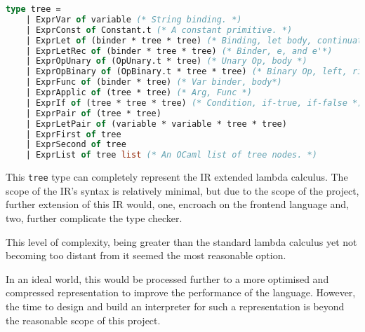 \documentclass{l4proj}
\begin{document}
\begin{lstlisting}[language=Caml, breaklines=false, label=ir-ast, caption=The Abstract Syntax for PyFunc's IR written in OCaml.]
type tree = 
    | ExprVar of variable (* String binding. *)
    | ExprConst of Constant.t (* A constant primitive. *)
    | ExprLet of (binder * tree * tree) (* Binding, let body, continuation. *)
    | ExprLetRec of (binder * tree * tree) (* Binder, e, and e'*)
    | ExprOpUnary of (OpUnary.t * tree) (* Unary Op, body *)
    | ExprOpBinary of (OpBinary.t * tree * tree) (* Binary Op, left, right *)
    | ExprFunc of (binder * tree) (* Var binder, body*)
    | ExprApplic of (tree * tree) (* Arg, Func *)
    | ExprIf of (tree * tree * tree) (* Condition, if-true, if-false *)
    | ExprPair of (tree * tree)
    | ExprLetPair of (variable * variable * tree * tree)
    | ExprFirst of tree
    | ExprSecond of tree
    | ExprList of tree list (* An OCaml list of tree nodes. *)
\end{lstlisting}


This \texttt{tree} type can completely represent the IR extended lambda calculus. 
The scope of the IR's syntax is relatively minimal, but due to the scope of the project, further extension of this IR would, one, encroach on the frontend language and, two, further complicate the type checker.

This level of complexity, being greater than the standard lambda calculus yet not becoming too distant from it seemed the most reasonable option.

In an ideal world, this would be processed further to a more optimised and compressed representation to improve the performance of the language.
However, the time to design and build an interpreter for such a representation is beyond the reasonable scope of this project.
\end{document}
